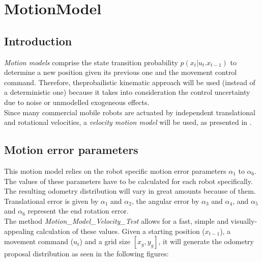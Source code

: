 \section{MotionModel}
\subsection{Introduction}
\textit{Motion models} comprise the state transition probability $p(x_t|u_t. x_{t-1})$ to determine a new position given its previous one and the movement control command. Therefore, theprobailistic kinematic approach will be used (instead of a deterministic one) because it takes into consideration the control uncertainty due to noise or unmodelled exogeneous effects.\\
Since many commercial mobile robots are actuated by independent translational and rotational velocities, a \textit{velocity motion model} will be used, as presented in \cite{ProbabilisticRobotics}.

\subsection{Motion error parameters}
This motion model relies on the robot specific motion error parameters $\alpha_1$ to $\alpha_6$. The values of these parameters have to be calculated for each robot specifically. The resulting odometry distribution will vary in great amounts because of them. Translational error is given by $\alpha_1$ and $\alpha_2$, the angular error by $\alpha_3$ and $\alpha_4$, and $\alpha_5$ and $\alpha_6$ represent the end rotation error.\\
The method \textit{Motion\_Model\_Velocity\_Test} allows for a fast, simple and visually-appealing calculation of these values. Given a starting position ($x_{t-1}$), a movement command ($u_{t}$) and a grid size $[x_g, y_g ]$, it will generate the odometry proposal distribution as seen in the following figures:

